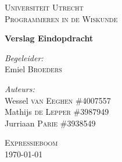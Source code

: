 \documentclass[12pt]{article}
\begin{document}
\begin{titlepage}
\begin{center}

\textsc{\LARGE Universiteit Utrecht}\\[1.6cm]

\textsc{\Large Programmeren in de Wiskunde}\vspace{2pc}

{\huge \bfseries Verslag Eindopdracht}
\vspace{3pc}

\begin{minipage}{0.7\textwidth}
\begin{flushleft} \large
\emph{Begeleider:} \\
Emiel \textsc{Broeders} 
\end{flushleft}
\begin{flushleft} \large
\emph{Auteurs:}\\
Wessel \textsc{van Eeghen} \tab\#4007557\\
Mathijs \textsc{de Lepper}  \tab\#3987949\\
Jurriaan \textsc{Parie}  \tab\tab\#3938549
\end{flushleft}
\end{minipage}
\begin{minipage}{0.4\textwidth}
\end{minipage}
\vspace{10pc} 

\textsc{\Large Expressieboom}\\[4.0cm]
{\large \today}
\end{center}
\end{titlepage}

\newpage
\end{document}
